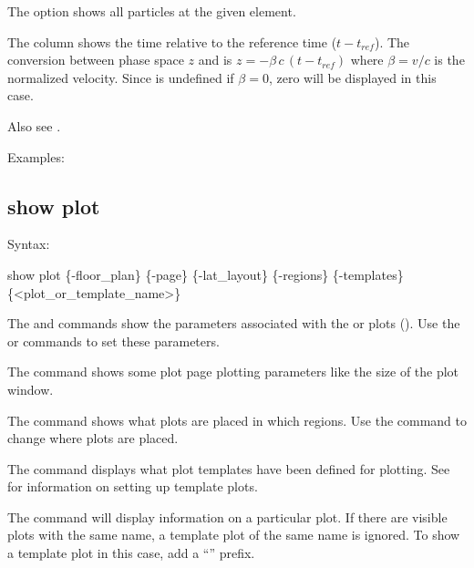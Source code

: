 {{{{{{{{{The  option shows all particles at the given element.

The  column shows the time relative to the reference time ($t - t_{ref}$). The conversion
between phase space $z$ and  is $z = -\beta \, c \, (t - t_{ref})$ where $\beta = v/c$ is
the normalized velocity. Since  is undefined if $\beta = 0$, zero will be displayed in
this case.

Also see .

Examples:


\subsection{show plot}
\label{s:show.plot}

Syntax:
\begin{example}
  show plot \{-floor_plan\} \{-page\} \{-lat_layout\} \{-regions\} 
            \{-templates\} \{<plot_or_template_name>\}
\end{example}

The  and  commands show the parameters
associated with the  or  plots (). Use the  or  commands to set these parameters.

The  command shows some plot page plotting parameters like the size of the plot
window.

The  command shows what plots are placed in which regions. Use the 
command to change where plots are placed.

The  command displays what plot templates have been defined for plotting.
See  for information on setting up template plots.

The  command will display information on a particular plot. If
there are visible plots with the same name, a template plot of the same name is ignored. To show a
template plot in this case, add a ``'' prefix.

}}}}}}}}}
